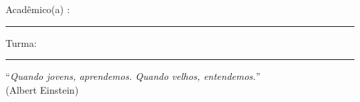 \documentclass[12pt]{article}
\begin{document}
\begin{large}
\begin{center}

\end{center}
\end{large} 

\vskip 0.2cm Acad\^emico(a) : \rule{10cm}{0.5pt} Turma:  \rule{1cm}{0.5pt}







\pagestyle{empty}



\begin{flushright}
``\textit{Quando jovens, \/aprendemos.
Quando velhos,  \/entendemos.}''\\ (Albert Einstein)
\end{flushright}
\end{document}
